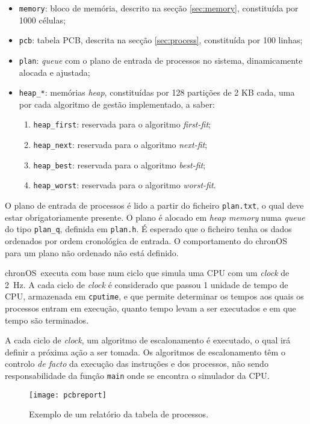 \documentclass[10pt,oneside]{estiloUBI}
\newcommand{\chronOS}{\textsf{chronOS}}
\begin{document}
	\begin{itemize}
		\item \verb|memory|: bloco de memória, descrito na secção \ref{sec:memory}, constituída por 1000 células;
		\item \verb|pcb|: tabela \ac{PCB}, descrita na secção \ref{sec:process}, constituída por 100 linhas;
		\item \verb|plan|: \textit{queue} com o plano de entrada de processos no sistema, dinamicamente alocada e ajustada;
		\item \verb|heap_*|: memórias \textit{heap}, constituídas por 128 partições de 2 KB cada, uma por cada algoritmo de gestão implementado, a saber:
		\begin{enumerate}
			\item \verb|heap_first|: reservada para o algoritmo \textit{first-fit};
			\item \verb|heap_next|: reservada para o algoritmo \textit{next-fit};
			\item \verb|heap_best|: reservada para o algoritmo \textit{best-fit};
			\item \verb|heap_worst|: reservada para o algoritmo \textit{worst-fit}.
		\end{enumerate}
	\end{itemize}

	O plano de entrada de processos é lido a partir do ficheiro \texttt{plan.txt}, o qual deve estar obrigatoriamente presente. O plano é alocado em \textit{heap memory} numa \textit{queue} do tipo \verb|plan_q|, definida em \verb|plan.h|. É esperado que o ficheiro tenha os dados ordenados por ordem cronológica de entrada. O comportamento do \chronOS~ para um plano não ordenado não está definido.
	
	\chronOS~executa com base num ciclo que simula uma \ac{CPU} com um \textit{clock} de \SI{2}{\hertz}. A cada ciclo de \textit{clock} é considerado que passou 1 unidade de tempo de \ac{CPU}, armazenada em \verb|cputime|, e que permite determinar os tempos aos quais os processos entram em execução, quanto tempo levam a ser executados e em que tempo são terminados.
	
	A cada ciclo de \textit{clock}, um algoritmo de escalonamento é executado, o qual irá definir a próxima ação a ser tomada. Os algoritmos de escalonamento têm o controlo \textit{de facto} da execução das instruções e dos processos, não sendo responsabilidade da função \verb|main| onde se encontra o simulador da \ac{CPU}.
	
	\begin{figure}[!btp]
		\centering
		\texttt{[image: pcbreport]}
		\caption{Exemplo de um relatório da tabela de processos.}
		\label{fig:pcbreport}
	\end{figure}
	
\end{document}
